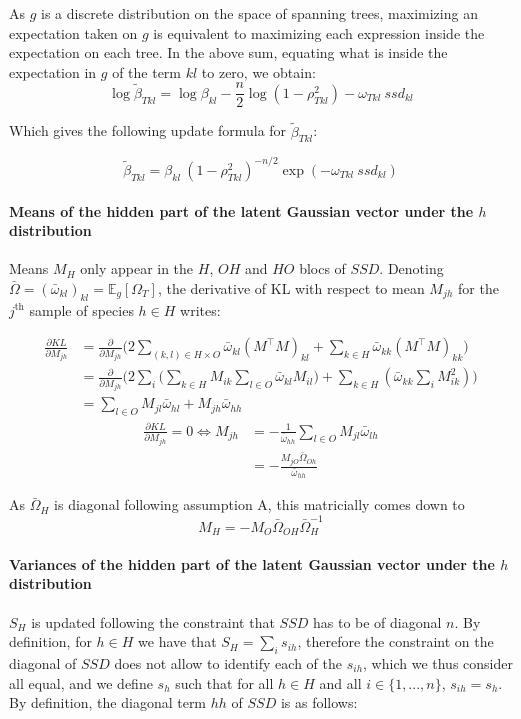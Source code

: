 \documentclass[11pt,a4paper]{article}
\newcommand{\Esp}{\mathds{E}}
\begin{document}
 
As $g$ is a discrete distribution on the space of spanning trees, maximizing an expectation taken on $g$ is equivalent to maximizing each expression inside the expectation on each tree. In the above sum, equating what is inside the expectation in $g$ of the term $kl$ to zero, we obtain:
 $$\log \widetilde{\beta}_{Tkl} = \log \beta_{kl} - \frac{n}{2} \log  (1-\rho_{Tkl}^2) - \omega_{Tkl}\:ssd_{kl}$$
 
Which gives the following update formula for $\widetilde{\beta}_{Tkl}$:
 
  $$\boxed{\displaystyle \widetilde{\beta}_{Tkl} = \beta_{kl} \: (1-\rho_{Tkl}^2)^{-n/2} \exp( -\omega_{Tkl}\: ssd_{kl} ) }$$


\paragraph{Means of the hidden part of the latent Gaussian vector under the $h$ distribution \\}
Means $M_H$ only appear in the $H$, $OH$ and $HO$ blocs of $SSD$. Denoting $\bar{\Omega} = (\bar{\omega}_{kl})_{kl} =\Esp_g[\Omega_T]$, the derivative of KL with respect to mean $M_{jh}$ for the $j^\text{th}$ sample of species $h\in H$ writes:

\begin{align*}
\frac{\partial KL}{\partial M_{jh}} &= \frac{\partial}{\partial M_{jh}}\Big(2\sum_{ (k, l) \in H\times O}\bar{\omega}_{kl} (M^\intercal M)_{kl} + \sum_{k\in H} \bar{\omega}_{kk} (M^\intercal M)_{kk}\Big)\\
&=\frac{\partial}{\partial M_{jh}}\Big(2\sum_i \Big(\sum_{k\in H} M_{ik}\sum_{l\in O}\bar{\omega}_{kl} M_{il}\Big) + \sum_{k\in H} (\bar{\omega}_{kk} \sum_i M_{ik}^2)\Big)\\
&=   \sum_{l \in O } M_{jl} \bar{\omega}_{hl} + M_{jh} \bar{\omega}_{hh}
\end{align*}
\begin{align*}
\frac{\partial KL}{\partial M_{jh}}  = 0\iff M_{jh} &= -\frac{1}{\bar{\omega}_{hh}} \sum_{l\in O} M_{jl}\bar{\omega}_{lh}\\
&=-\frac{M_{jO} \bar{\Omega}_{Oh}}{\bar{\omega}_{hh}}
\end{align*}

As $\bar{\Omega}_H$ is diagonal following assumption A, this  matricially comes down to
$$\boxed{ M_H = -M_O\bar{\Omega}_{OH} \bar{\Omega}_H^{-1}}$$


\paragraph{Variances of the hidden part of the latent Gaussian vector under the $h$ distribution \\}
$S_H$ is updated following the constraint that $SSD$ has to be of diagonal $n$. By definition, for $h\in H$ we have that $S_H = \sum_i s_{ih}$, therefore the constraint on the diagonal of $SSD$ does not allow to identify each of the $s_{ih}$, which we thus consider all equal, and we define $s_h$ such that for all $ h\in H$ and all $ i\in \{1,...,n\}$, $s_{ih} = s_h$.  By definition, the diagonal term $hh$ of $SSD$ is as follows:
\end{document}
